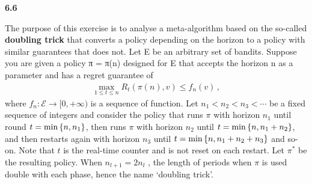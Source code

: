 \textbf{\noindent\textbf{6.6}}

The purpose of this exercise is to analyse a meta-algorithm based on the so-called \textbf{doubling trick} that converts a policy depending on the horizon to a policy with similar
guarantees that does not. Let E be an arbitrary set of bandits. Suppose you are given a policy π = π(n)
designed for E that accepts the horizon n as a parameter and has a regret guarantee of
\begin{align*}
    \max_{1\leq t\leq n} R_t(\pi(n),v)\leq f_n(v) \, ,
\end{align*}
where $f_n:\mathcal{E}\rightarrow [0,+\infty)$ is a sequence of function. Let $n_1 < n_2 < n_3 < \cdots$ be a fixed sequence of integers and consider the policy that runs $\pi$ with horizon $n_1$ until round $t =\min\left\{ n, n_1 \right\}$, then runs $\pi$ with horizon $n_2$ until $t = \min\left\{ n, n_1 + n_2 \right\}$, and then restarts again with horizon $n_3$ until $t = \min\left\{ n, n_1 + n_2 + n_3 \right\}$ and so-on. Note that $t$ is the real-time counter and is not reset on each restart. Let $\pi^*$ be the resulting policy. When $n_{l+1} = 2n_l$ , the length of periods when $\pi$ is used double with each phase, hence the name ‘doubling trick’.

